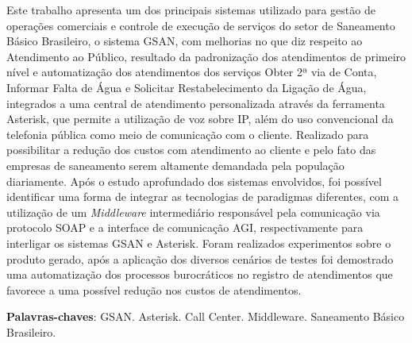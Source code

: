 \begin{resumo}
 
Este trabalho apresenta um dos principais sistemas utilizado para gestão de operações comerciais e controle de execução de serviços do setor de Saneamento Básico Brasileiro, o sistema GSAN, com melhorias no que diz respeito ao Atendimento ao Público, resultado da padronização dos atendimentos de primeiro nível e automatização dos atendimentos dos serviços Obter 2ª via de Conta, Informar Falta de Água e Solicitar Restabelecimento da Ligação de Água, integrados a uma central de atendimento personalizada através da ferramenta Asterisk, que permite a utilização de voz sobre IP, além do uso convencional da telefonia pública como meio de comunicação com o cliente. Realizado para possibilitar a redução dos custos com atendimento ao cliente e pelo fato das empresas de saneamento serem altamente demandada pela população diariamente. Após o estudo aprofundado dos sistemas envolvidos, foi possível identificar uma forma de integrar as tecnologias de paradigmas diferentes, com a utilização de um \textit{Middleware} intermediário responsável pela comunicação via protocolo SOAP e a interface de comunicação AGI, respectivamente para interligar os sistemas GSAN e Asterisk.  Foram realizados experimentos sobre o produto gerado, após a aplicação dos diversos cenários de testes foi demostrado uma automatização dos processos burocráticos no registro de atendimentos que favorece a uma possível redução nos custos de atendimentos.


 \textbf{Palavras-chaves}: GSAN. Asterisk. Call Center. Middleware. Saneamento Básico Brasileiro.
\end{resumo}